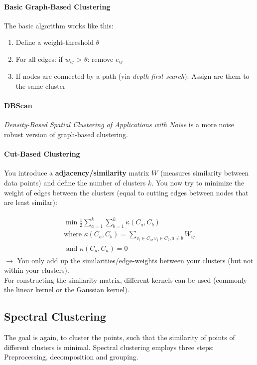\documentclass[../main.tex]{subfiles}
\begin{document}
    \paragraph{Basic Graph-Based Clustering} The basic algorithm works like this:
        \begin{enumerate}
            \item Define a weight-threshold $\theta$
            \item For all edges: if $w_{ij}$ > $\theta$: remove $e_{ij}$
            \item If nodes are connected by a path (via \textit{depth first search}): Assign are them to the same cluster
        \end{enumerate}
    \paragraph{DBScan} \textit{Density-Based Spatial Clustering of Applications with Noise} is a more noise robust version of graph-based clustering. 
        
    \paragraph{Cut-Based Clustering} You introduce a \textbf{adjacency/similarity} matrix $W$ (measures similarity between data points) and define the number of clusters $k$. You now try to minimize the weight of edges between the clusters (equal to cutting edges between nodes that are least similar): 

            \begin{align*}
                \begin{split}  
                    \min \frac{1}{2} \sum_{a=1}^k \sum_{b=1}^k \kappa(C_a, C_b) \\
                    \text{where } \kappa(C_a, C_b) = \sum_{v_i \in C_a , v_j \in C_b , a \neq b} W_{ij} \\ 
                    \text{ and } \kappa(C_a, C_a) = 0
                \end{split}
            \end{align*}
            $\rightarrow$ You only add up the similarities/edge-weights between your clusters (but not within your clusters). \\
            \btw For constructing the similarity matrix, different kernels can be used (commonly the linear kernel or the Gaussian kernel).

\subsection{Spectral Clustering} \label{Spectral Clustering}
The goal is again, to cluster the points, such that the similarity of points of different clusters is minimal. Spectral clustering employs three steps: Preprocessing, decomposition and grouping. 
\end{document}
